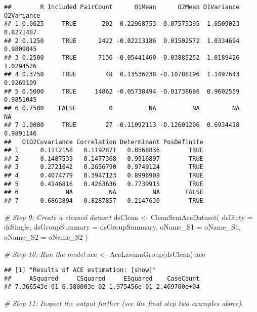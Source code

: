 \documentclass[smallextended]{svjour3}       %
\newenvironment{Shaded}{\begin{snugshade}}{\end{snugshade}}
\newcommand{\AttributeTok}[1]{\textcolor[rgb]{0.77,0.63,0.00}{#1}}
\newcommand{\CommentTok}[1]{\textcolor[rgb]{0.56,0.35,0.01}{\textit{#1}}}
\newcommand{\FunctionTok}[1]{\textcolor[rgb]{0.00,0.00,0.00}{#1}}
\newcommand{\NormalTok}[1]{#1}
\newcommand{\OtherTok}[1]{\textcolor[rgb]{0.56,0.35,0.01}{#1}}
\begin{document}
\begin{verbatim}
##        R Included PairCount      O1Mean      O2Mean O1Variance O2Variance
## 1 0.0625     TRUE       202  0.22968753 -0.07575395  1.0509023  0.8271487
## 2 0.1250     TRUE      2422 -0.02213186  0.01502572  1.0334694  0.9809845
## 3 0.2500     TRUE      7136 -0.05441460 -0.03885252  1.0189426  1.0294526
## 4 0.3750     TRUE        48  0.13536238 -0.10786196  1.1497643  0.9269109
## 5 0.5000     TRUE     14862 -0.05738494 -0.01738686  0.9602559  0.9851045
## 6 0.7500    FALSE         0          NA          NA         NA         NA
## 7 1.0000     TRUE        27 -0.11092113 -0.12601206  0.6934418  0.9891146
##   O1O2Covariance Correlation Determinant PosDefinite
## 1      0.1112158   0.1192871   0.8568836        TRUE
## 2      0.1487539   0.1477368   0.9916897        TRUE
## 3      0.2721042   0.2656790   0.9749124        TRUE
## 4      0.4074779   0.3947123   0.8996908        TRUE
## 5      0.4146816   0.4263636   0.7739915        TRUE
## 6             NA          NA          NA       FALSE
## 7      0.6863894   0.8287857   0.2147630        TRUE
\end{verbatim}

\begin{Shaded}
\begin{Highlighting}[]
\CommentTok{\# Step 9: Create a cleaned dataset}
\NormalTok{dsClean }\OtherTok{\textless{}{-}} 
  \FunctionTok{CleanSemAceDataset}\NormalTok{(}
    \AttributeTok{dsDirty         =}\NormalTok{ dsSingle, }
    \AttributeTok{dsGroupSummary  =}\NormalTok{ dsGroupSummary, }
    \AttributeTok{oName\_S1        =}\NormalTok{ oName\_S1, }
    \AttributeTok{oName\_S2        =}\NormalTok{ oName\_S2}
\NormalTok{  )}

\CommentTok{\# Step 10: Run the model}
\NormalTok{ace }\OtherTok{\textless{}{-}} \FunctionTok{AceLavaanGroup}\NormalTok{(dsClean)}
\NormalTok{ace}
\end{Highlighting}
\end{Shaded}

\begin{verbatim}
## [1] "Results of ACE estimation: [show]"
##     ASquared     CSquared     ESquared    CaseCount 
## 7.366543e-01 6.580003e-02 1.975456e-01 2.469700e+04
\end{verbatim}

\begin{Shaded}
\begin{Highlighting}[]
\CommentTok{\# Step 11: Inspect the output further (see the final step two examples above).}
\end{Highlighting}
\end{Shaded}
\end{document}
